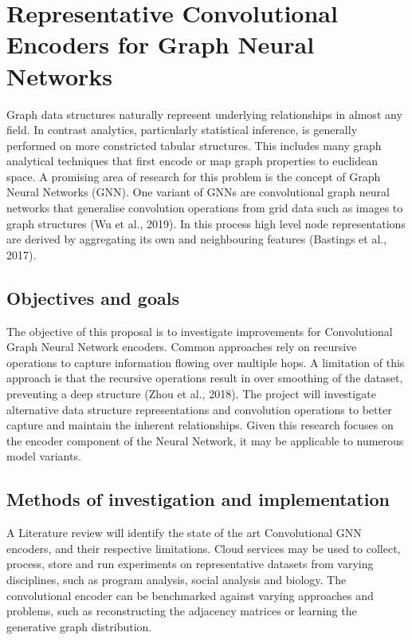 \section*{Representative Convolutional Encoders for Graph Neural Networks}
Graph data structures naturally represent underlying relationships in almost any field. In contrast analytics, particularly statistical inference, is generally performed on more constricted tabular structures. This includes many graph analytical techniques that first encode or map graph properties to euclidean space. A promising area of research for this problem is the concept of Graph Neural Networks (GNN). One variant of GNNs are convolutional graph neural networks that generalise convolution operations from grid data such as images to graph structures (Wu et al., 2019). In this process high level node representations are derived by aggregating its own and neighbouring features (Bastings et al., 2017).

\subsection*{Objectives and goals}
The objective of this proposal is to investigate improvements for Convolutional Graph Neural Network encoders. Common approaches rely on recursive operations to capture information flowing over multiple hops. A limitation of this approach is that the recursive operations result in over smoothing of the dataset, preventing a deep structure (Zhou et al., 2018). The project will investigate alternative data structure representations and convolution operations to better capture and maintain the inherent relationships. Given this research focuses on the encoder component of the Neural Network, it may be applicable to numerous model variants.

\subsection*{Methods of investigation and implementation}
A Literature review will identify the state of the art Convolutional GNN encoders, and their respective limitations. Cloud services may be used to collect, process, store and run experiments on representative datasets from varying disciplines, such as program analysis, social analysis and biology. The convolutional encoder can be benchmarked against varying approaches and problems, such as reconstructing the adjacency matrices or learning the generative graph distribution.

